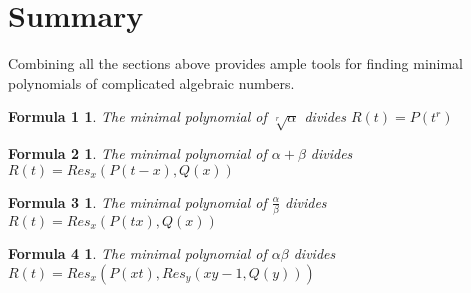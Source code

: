 \documentclass{article}
\newtheorem*{Definition: Sylvester Matrix}{Definition}
\newtheorem*{Definition: Resultant 1}{Definition 1}
\newtheorem*{Definition: Resultant 2}{Definition 2}
\newtheorem*{Theorem: Resultant proves shared roots}{Theorem 1}
\newtheorem*{Theorem: Minimal polynomial for beta}{Theorem 2}
\newtheorem*{Example: Sylvester Matrix Ex}{Example}
\newtheorem*{Theorem: Roots}{Theorem}
\newtheorem*{Corollary: Discriminant}{Corollary}
\newtheorem*{Theorem: Rational Root Theorem}{Theorem}
\newtheorem*{Corollary: Cubic Irreducibility}{Corollary}
\newtheorem*{Theorem: Eisenstein Criterion}{Theorem}
\newtheorem*{Theorem: mod p Test}{Theorem}
\newtheorem*{Theorem: Rabin's algorithm}{Theorem}
\newtheorem*{Theorem: gcd finite field}{Theorem}
\newtheorem*{Theorem: Gauss Irreducibles}{Theorem}
\newtheorem*{Theorem: Number of irreducibles}{Theorem}
\newtheorem*{Example: All irreducibles in Z_2}{Example}
\newtheorem*{Formula: Minimal polynomial for r root of a}{Formula 1}
\newtheorem*{Example: minimal polynomial for sqrt(p)}{Example}
\newtheorem*{Example: Golden Ratio}{Example}
\newtheorem*{Formula: Minimal polynomial for a+b}{Formula 2}
\newtheorem*{Example: 1 + sqrt(3)}{Example}
\newtheorem*{Example: cubic root of unity}{Example}
\newtheorem*{Formula: Minimal polynomial for a/b}{Formula 3}
\newtheorem*{Formula: Minimal polynomial for ab}{Formula 4}
\newtheorem*{Example: cubrt(4)/i+1}{Example}
\newtheorem*{Example: 5zeta}{Example}
\newtheorem*{Example: Wild one}{Example}
\begin{document}
\section{Summary}

Combining all the sections above provides ample tools for finding minimal polynomials of complicated algebraic numbers. 

\begin{Formula: Minimal polynomial for r root of a}
The minimal polynomial of $\sqrt[r]{\alpha}$ divides $R(t) =P(t^r)$
\end{Formula: Minimal polynomial for r root of a}

\begin{Formula: Minimal polynomial for a+b}
The minimal polynomial of $\alpha + \beta$ divides $R(t) = Res_x(P(t-x), Q(x))$
\end{Formula: Minimal polynomial for a+b}

\begin{Formula: Minimal polynomial for a/b}
The minimal polynomial of $\frac{\alpha}{\beta}$ divides $R(t) = Res_x(P(tx), Q(x))$
\end{Formula: Minimal polynomial for a/b}

\begin{Formula: Minimal polynomial for ab}
The minimal polynomial of $\alpha \beta$ divides $R(t)=Res_x(P(xt), Res_y(xy-1, Q(y)))$
\end{Formula: Minimal polynomial for ab}
\end{document}
